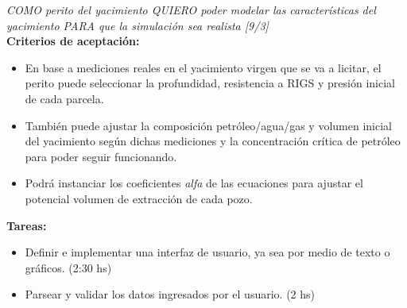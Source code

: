 \begin{tcolorbox}
\textit{COMO perito del yacimiento QUIERO poder modelar las características del yacimiento PARA que la simulación sea realista [9/3]}\\

\textbf{Criterios de aceptación:}
\begin{itemize}
	\item En base a mediciones reales en el yacimiento virgen que se va a licitar, el perito puede seleccionar la profundidad, resistencia a RIGS y presión inicial de cada parcela.

    \item También puede ajustar la composición petróleo/agua/gas y volumen inicial del yacimiento según dichas mediciones y la concentración crítica de petróleo para poder seguir funcionando.

    \item Podrá instanciar los coeficientes \textit{alfa} de las ecuaciones para ajustar el potencial volumen de extracción de cada pozo.
\end{itemize}

\textbf{Tareas:}
\begin{itemize}
	\item Definir e implementar una interfaz de usuario, ya sea por medio de texto o gráficos. (2:30 hs)
    \item Parsear y validar los datos ingresados por el usuario. (2 hs)
\end{itemize}
\end{tcolorbox}

